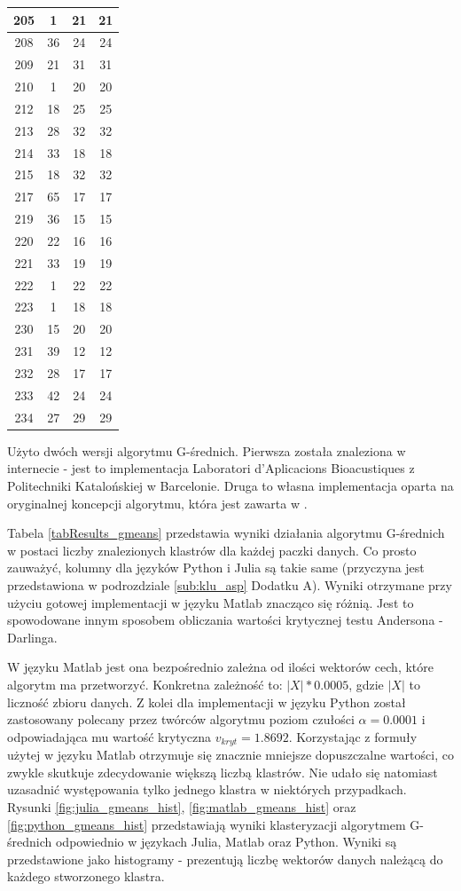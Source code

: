 \begin{table}[!tp]
\begin{tabular}{|c|c|c|c|}
		205 &  1 & 21 & 21\\ \hline
		208 & 36 & 24 & 24\\ \hline
		209 & 21 & 31 & 31\\ \hline
		210 &  1 & 20 & 20\\ \hline
		212 & 18 & 25 & 25\\ \hline
		213 & 28 & 32 & 32\\ \hline
		214 & 33 & 18 & 18\\ \hline
		215 & 18 & 32 & 32\\ \hline
		217 & 65 & 17 & 17\\ \hline
		219 & 36 & 15 & 15\\ \hline
		220 & 22 & 16 & 16\\ \hline	
		221 & 33 & 19 & 19\\ \hline
		222 &  1 & 22 & 22\\ \hline
		223 &  1 & 18 & 18\\ \hline
		230 & 15 & 20 & 20\\ \hline
		231 & 39 & 12 & 12\\ \hline
		232 & 28 & 17 & 17\\ \hline
		233 & 42 & 24 & 24\\ \hline
		234 & 27 & 29 & 29\\ \hline
	\end{tabular}
\end{table}

\qquad Użyto dwóch wersji algorytmu G-średnich. Pierwsza została znaleziona w internecie - jest to implementacja Laboratori d'Aplicacions Bioacustiques z Politechniki Katalońskiej w Barcelonie. Druga to własna implementacja oparta na oryginalnej koncepcji algorytmu, która jest zawarta w \cite{GMeans}.

Tabela \ref{tabResults_gmeans} przedstawia wyniki działania algorytmu G-średnich w postaci liczby znalezionych klastrów dla każdej paczki danych. Co prosto zauważyć, kolumny dla języków Python i Julia są takie same (przyczyna jest przedstawiona w podrozdziale \ref{sub:klu_asp} Dodatku A). Wyniki otrzymane przy użyciu gotowej implementacji w języku Matlab znacząco się różnią. Jest to spowodowane innym sposobem obliczania wartości krytycznej testu Andersona - Darlinga.

W języku Matlab jest ona bezpośrednio zależna od ilości wektorów cech, które algorytm ma przetworzyć. Konkretna zależność to: $|X| * 0.0005$, gdzie $|X|$ to liczność zbioru danych. Z kolei dla implementacji w języku Python został zastosowany polecany przez twórców algorytmu poziom czułości $\alpha = 0.0001$ i odpowiadająca mu wartość krytyczna $v_{kryt} = 1.8692$. Korzystając z formuły użytej w języku Matlab otrzymuje się znacznie mniejsze dopuszczalne wartości, co zwykle skutkuje zdecydowanie większą liczbą klastrów. Nie udało się natomiast uzasadnić występowania tylko jednego klastra w niektórych przypadkach. Rysunki \ref{fig:julia_gmeans_hist}, \ref{fig:matlab_gmeans_hist} oraz \ref{fig:python_gmeans_hist} przedstawiają wyniki klasteryzacji algorytmem G-średnich odpowiednio w językach Julia, Matlab oraz Python. Wyniki są przedstawione jako histogramy - prezentują liczbę wektorów danych należącą do każdego stworzonego klastra.

